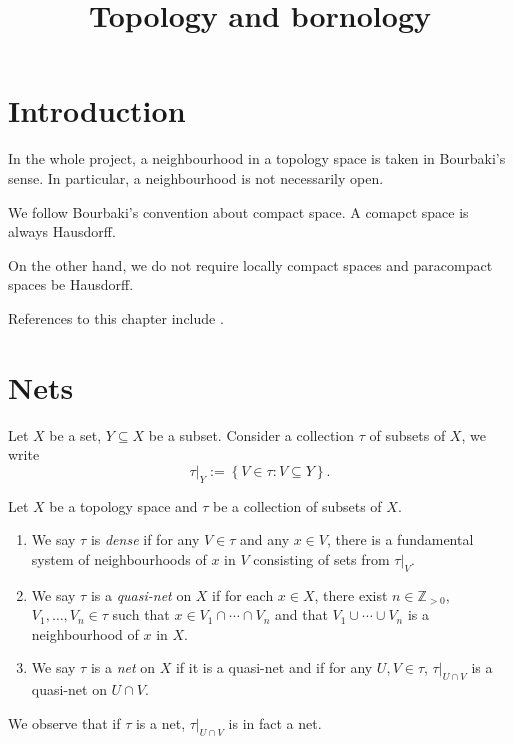 
\title{Topology and bornology}

\maketitle
\tableofcontents



\section{Introduction}\label{sec-introduction}

In the whole project, a neighbourhood in a topology space is taken in Bourbaki's sense. In particular, a neighbourhood is not necessarily open.

We follow Bourbaki's convention about compact space. A comapct space is always Hausdorff. 

On the other hand, we do not require locally compact spaces and paracompact spaces be Hausdorff.

References to this chapter include \cite{Berk93}.

\section{Nets}\label{sec-nets}

Let $X$ be a set, $Y\subseteq X$ be a subset. Consider a collection $\tau$ of subsets of $X$, we write
\[
    \tau|_Y:=\left\{V\in \tau: V\subseteq Y \right\}.    
\]

\begin{definition}
    Let $X$ be a topology space and $\tau$ be a collection of subsets of $X$. 
    \begin{enumerate}
        \item We say $\tau$ is \emph{dense} if for any $V\in \tau$ and any $x\in V$, there is a fundamental system of neighbourhoods of $x$ in $V$ consisting of sets from $\tau|_V$.
        \item We say $\tau$ is a \emph{quasi-net} on $X$ if for each $x\in X$, there exist $n\in \mathbb{Z}_{>0}$, $V_1,\ldots,V_n\in \tau$ such that $x\in V_1\cap \cdots\cap V_n$ and that $V_1\cup\cdots\cup V_n$ is a neighbourhood of $x$ in $X$.
        \item We say $\tau$ is a \emph{net} on $X$ if it is a quasi-net and if for any $U,V\in \tau$, $\tau|_{U\cap V}$ is a quasi-net on $U\cap V$.
    \end{enumerate}
\end{definition}
We observe that if $\tau$ is a net, $\tau|_{U\cap V}$ is in fact a net.

